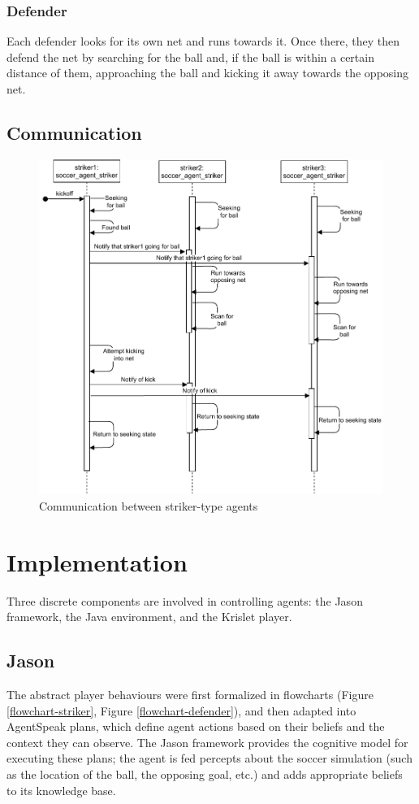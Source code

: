 \documentclass[conference]{IEEEtran}
\begin{document}
\subsubsection{Defender}
Each defender looks for its own net and runs towards it. Once there, they then defend the net by searching for the ball and, if the ball is within a certain distance of them, approaching the ball and kicking it away towards the opposing net.

\subsection{Communication}
\begin{figure}[h]
	\centering
	\includegraphics[scale=0.5]{fig/sequence-diagram.pdf}
	\caption{Communication between striker-type agents}
	\label{sequence-diagram}
\end{figure}



\section{Implementation}
Three discrete components are involved in controlling agents: the Jason framework, the Java environment, and the Krislet player. 

\subsection{Jason}
The abstract player behaviours were first formalized in flowcharts (Figure \ref{flowchart-striker}, Figure  \ref{flowchart-defender}), and then adapted into AgentSpeak plans, which define agent actions based on their beliefs and the context they can observe. The Jason framework provides the cognitive model for executing these plans; the agent is fed percepts about the soccer simulation (such as the location of the ball, the opposing goal, etc.) and adds appropriate beliefs to its knowledge base.
\end{document}
